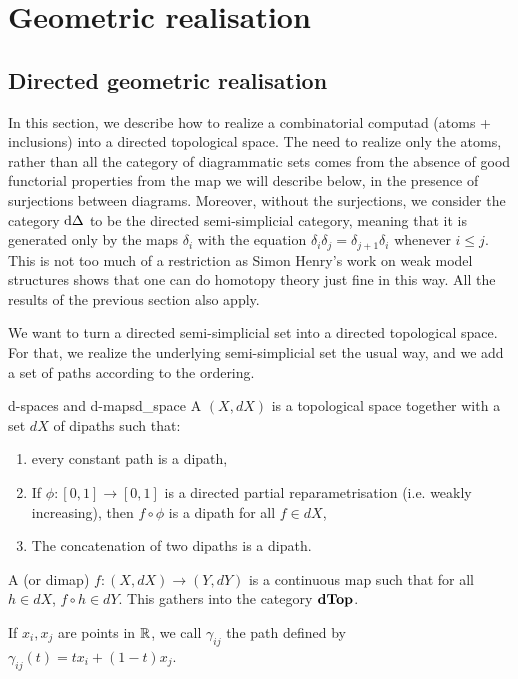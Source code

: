 \section{Geometric realisation}

\subsection{Directed geometric realisation}

In this section, we describe how to realize a combinatorial computad (atoms + inclusions) into a directed topological space. The need to realize only the atoms, rather than all the category of diagrammatic sets comes from the absence of good functorial properties from the map we will describe below, in the presence of surjections between diagrams. Moreover, without the surjections, we consider the category \( \mathrm{d}\Delta \) to be the directed semi-simplicial category, meaning that it is generated only by the maps \( \delta_i \) with the equation \( \delta_i\delta_j = \delta_{j+1}\delta_i \) whenever \( i \le j \). This is not too much of a restriction as Simon Henry's work on weak model structures shows that one can do homotopy theory just fine in this way. All the results of the previous section also apply.

We want to turn a directed semi-simplicial set into a directed topological space. For that, we realize the underlying semi-simplicial set the usual way, and we add a set of paths according to the ordering.  

\begin{cdef}{d-spaces and d-maps}{d_space}
    A  \( (X, dX) \) is a topological space together with a set \( dX \) of dipaths such that:
    \begin{enumerate}
        \item every constant path is a dipath,
        \item If \( \phi : [0, 1] \to [0, 1] \) is a directed partial reparametrisation (i.e. weakly increasing), then \( f \circ \phi \) is a dipath for all \( f \in dX \),
        \item The concatenation of two dipaths is a dipath. 
    \end{enumerate}
    A  (or dimap) \( f : (X, dX) \to (Y, dY) \) is a continuous map such that for all \( h \in dX \), \( f \circ h \in dY \). This gathers into the category \( \mathbf{dTop} \).
\end{cdef}

If \( x_i, x_j \) are points in \( \mathbb{R} \), we call \( \gamma_{ij} \) the path defined by \( \gamma_{ij}(t) = tx_i + (1-t)x_j \).

